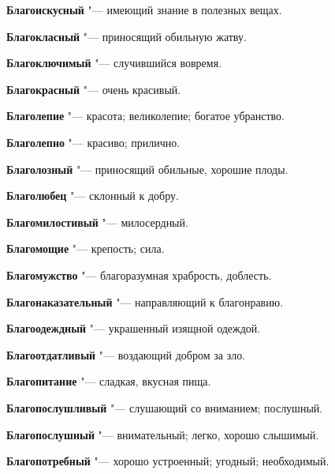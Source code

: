 \begin{mymulticols}{2}
\noindent\textbf{Благоискусный} "--- имеющий знание в полезных вещах. 




\noindent\textbf{Благокласный} "--- приносящий обильную жатву. 




\noindent\textbf{Благоключимый} "--- случившийся вовремя. 




\noindent\textbf{Благокрасный} "--- очень красивый. 




\noindent\textbf{Благолепие} "--- красота; великолепие; богатое убранство. 




\noindent\textbf{Благолепно} "--- красиво; прилично. 




\noindent\textbf{Благолозный} "--- приносящий обильные, хорошие плоды. 




\noindent\textbf{Благолюбец} "--- склонный к добру. 




\noindent\textbf{Благомилостивый} "--- милосердный. 




\noindent\textbf{Благомощие} "--- крепость; сила. 




\noindent\textbf{Благомужство} "--- благоразумная храбрость, доблесть. 




\noindent\textbf{Благонаказательный} "--- направляющий к благонравию. 




\noindent\textbf{Благоодеждный} "--- украшенный изящной одеждой. 




\noindent\textbf{Благоотдатливый} "--- воздающий добром за зло. 




\noindent\textbf{Благопитание} "--- сладкая, вкусная пища. 




\noindent\textbf{Благопослушливый} "--- слушающий со вниманием; послушный. 




\noindent\textbf{Благопослушный} "--- внимательный; легко, хорошо слышимый. 




\noindent\textbf{Благопотребный} "--- хорошо устроенный; угодный; необходимый. 





\end{mymulticols}
